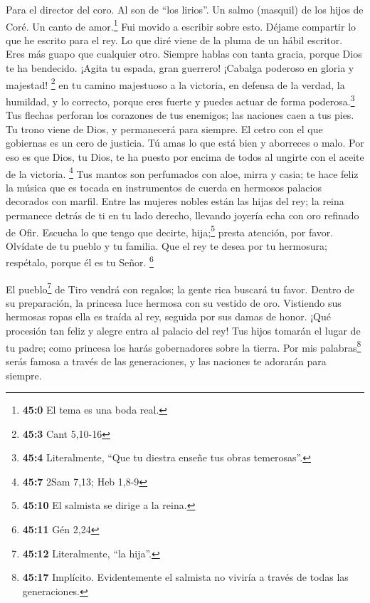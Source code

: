 Para el director del coro. Al son de ``los lirios''. Un salmo (masquil)
de los hijos de Coré. Un canto de amor.\footnote{\textbf{45:0} El tema
  es una boda real.}  Fui movido a escribir sobre esto.
Déjame compartir lo que he escrito para el rey. Lo que diré viene de la
pluma de un hábil escritor.  Eres más guapo que cualquier
otro. Siempre hablas con tanta gracia, porque Dios te ha bendecido.
 ¡Agita tu espada, gran guerrero! ¡Cabalga poderoso en
gloria y majestad! \footnote{\textbf{45:3} Cant 5,10-16} 
en tu camino majestuoso a la victoria, en defensa de la verdad, la
humildad, y lo correcto, porque eres fuerte y puedes actuar de forma
poderosa.\footnote{\textbf{45:4} Literalmente, ``Que tu diestra enseñe
  tus obras temerosas''.}  Tus flechas perforan los
corazones de tus enemigos; las naciones caen a tus pies. 
Tu trono viene de Dios, y permanecerá para siempre. El cetro con el que
gobiernas es un cero de justicia.  Tú amas lo que está
bien y aborreces o malo. Por eso es que Dios, tu Dios, te ha puesto por
encima de todos al ungirte con el aceite de la victoria. \footnote{\textbf{45:7}
  2Sam 7,13; Heb 1,8-9}  Tus mantos son perfumados con
aloe, mirra y casia; te hace feliz la música que es tocada en
instrumentos de cuerda en hermosos palacios decorados con marfil.
 Entre las mujeres nobles están las hijas del rey; la
reina permanece detrás de ti en tu lado derecho, llevando joyería echa
con oro refinado de Ofir.  Escucha lo que tengo que
decirte, hija;\footnote{\textbf{45:10} El salmista se dirige a la reina.}
presta atención, por favor. Olvídate de tu pueblo y tu familia.
 Que el rey te desea por tu hermosura; respétalo, porque
él es tu Señor. \footnote{\textbf{45:11} Gén 2,24}

 El pueblo\footnote{\textbf{45:12} Literalmente, ``la
  hija''.} de Tiro vendrá con regalos; la gente rica buscará tu favor.
 Dentro de su preparación, la princesa luce hermosa con
su vestido de oro.  Vistiendo sus hermosas ropas ella es
traída al rey, seguida por sus damas de honor.  ¡Qué
procesión tan feliz y alegre entra al palacio del rey! 
Tus hijos tomarán el lugar de tu padre; como princesa los harás
gobernadores sobre la tierra.  Por mis
palabras\footnote{\textbf{45:17} Implícito. Evidentemente el salmista no
  viviría a través de todas las generaciones.} serás famosa a través de
las generaciones, y las naciones te adorarán para siempre.

